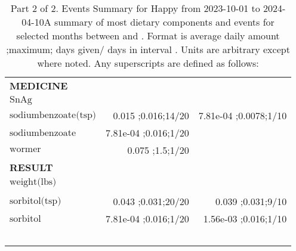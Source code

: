\begin{table}[H]
\begin{tabular}{|l|r|r|}
{\bf MEDICINE}&&\\
$\textrm{SnAg}$&&\\
$\textrm{sodiumbenzoate(tsp)}$&0.015 ;0.016;14/20&7.81e-04 ;0.0078;1/10\\
$\textrm{sodiumbenzoate}$&7.81e-04 ;0.016;1/20&\\
$\textrm{wormer}$&0.075 ;1.5;1/20&\\
{\bf RESULT}&&\\
$\textrm{weight(lbs)}$&&\\
&&\\
$\textrm{sorbitol(tsp)}$&0.043 ;0.031;20/20&0.039 ;0.031;9/10\\
$\textrm{sorbitol}$&7.81e-04 ;0.016;1/20&1.56e-03 ;0.016;1/10\\
&&\\
&&\\
&&\\
&&\\
&&\\
\hline
\end{tabular}
\caption{Part 2 of 2.  Events Summary for Happy   from 2023-10-01 to 2024-04-10A summary of most dietary components and events  for selected months between \mjmdatemin and \mjmdatemax. Format is average daily amount ;maximum; days given/ days in interval . Units are arbitrary except where noted. Any  superscripts are defined as follows:  \mjmsuperscripts}
\end{table}
